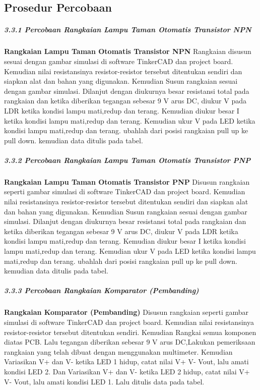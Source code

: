 \documentclass[12pt,a4paper]{article}
\begin{document}
\subsection{Prosedur Percobaan}
\subparagraph{3.3.1 Percobaan Rangkaian Lampu Taman Otomatis Transistor NPN }
\subparagraph{ }
\textbf{Rangkaian Lampu Taman Otomatis Transistor NPN} Rangkaian disusun sesuai dengan gambar simulasi di software TinkerCAD dan project board. Kemudian nilai resistansinya resistor-resistor tersebut ditentukan sendiri dan siapkan alat dan bahan yang digunakan. Kemudian Susun rangkaian sesuai dengan gambar simulasi. Dilanjut dengan diukurnya besar resistansi total pada rangkaian dan ketika diberikan tegangan sebesar 9 V arus DC, diukur  V pada LDR ketika kondisi lampu mati,redup dan terang. Kemudian diukur besar I ketika kondisi lampu mati,redup dan terang. Kemudian ukur V pada LED ketika kondisi lampu mati,redup dan terang. ubahlah dari posisi rangkaian pull up ke pull down. kemudian data ditulis pada tabel.
	
\subparagraph{3.3.2 Percobaan Rangkaian Lampu Taman Otomatis Transistor PNP }
\subparagraph{ }
	\textbf{Rangkaian Lampu Taman Otomatis Transistor PNP} Disusun rangkaian seperti gambar simulasi di software TinkerCAD dan project board. Kemudian nilai resistansinya resistor-resistor tersebut ditentukan sendiri dan siapkan alat dan bahan yang digunakan. Kemudian Susun rangkaian sesuai dengan gambar simulasi. Dilanjut dengan diukurnya besar resistansi total pada rangkaian dan ketika diberikan tegangan sebesar 9 V arus DC, diukur  V pada LDR ketika kondisi lampu mati,redup dan terang. Kemudian diukur besar I ketika kondisi lampu mati,redup dan terang. Kemudian ukur V pada LED ketika kondisi lampu mati,redup dan terang. ubahlah dari posisi rangkaian pull up ke pull down. kemudian data ditulis pada tabel.
	
\subparagraph{3.3.3 Percobaan Rangkaian Komparator (Pembanding)}
\subparagraph{ }
	\textbf{Rangkaian Komparator (Pembanding)} Disusun rangkaian seperti gambar simulasi di software TinkerCAD dan project board. Kemudian nilai resistansinya resistor-resistor tersebut ditentukan sendiri. Kemudian Rangkai semua komponen diatas PCB. Lalu tegangan diberikan sebesar 9 V arus DC,Lakukan pemeriksaan rangkaian yang telah dibuat dengan menggunakan multimeter. Kemudian Variasikan V+ dan V- ketika LED 1 hidup, catat nilai V+ V- Vout, lalu amati kondisi LED 2. Dan Variasikan V+ dan V- ketika LED 2 hidup, catat nilai V+ V- Vout, lalu amati kondisi LED 1. Lalu ditulis data pada tabel.
\end{document}
